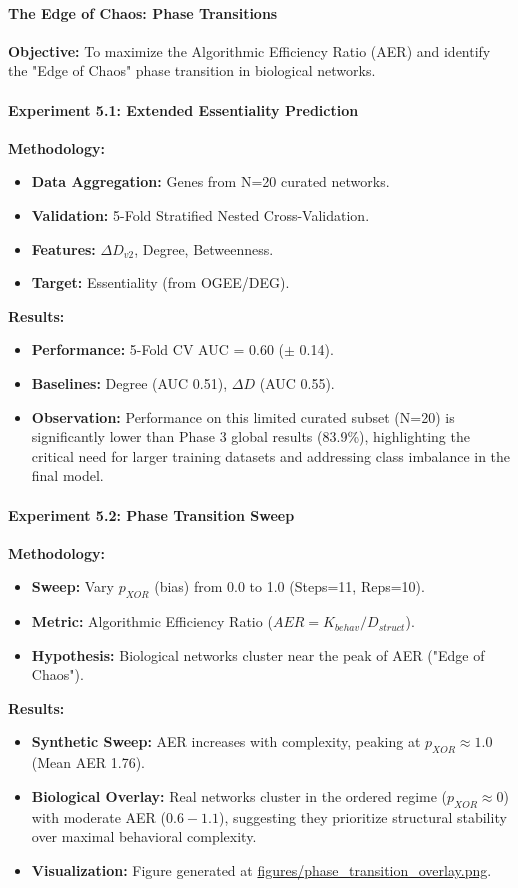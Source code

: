 \paragraph{The Edge of Chaos: Phase Transitions}
\textbf{Objective:} To maximize the Algorithmic Efficiency Ratio (AER) and identify the "Edge of Chaos" phase transition in biological networks.

\paragraph{Experiment 5.1: Extended Essentiality Prediction}
\textbf{Methodology:}
\begin{itemize}
    \item \textbf{Data Aggregation:} Genes from N=20 curated networks.
    \item \textbf{Validation:} 5-Fold Stratified Nested Cross-Validation.
    \item \textbf{Features:} $\Delta D_{v2}$, Degree, Betweenness.
    \item \textbf{Target:} Essentiality (from OGEE/DEG).
\end{itemize}
\textbf{Results:}
\begin{itemize}
    \item \textbf{Performance:} 5-Fold CV AUC = 0.60 ($\pm$ 0.14).
    \item \textbf{Baselines:} Degree (AUC 0.51), $\Delta D$ (AUC 0.55).
    \item \textbf{Observation:} Performance on this limited curated subset (N=20) is significantly lower than Phase 3 global results (83.9\%), highlighting the critical need for larger training datasets and addressing class imbalance in the final model.
\end{itemize}

\paragraph{Experiment 5.2: Phase Transition Sweep}
\textbf{Methodology:}
\begin{itemize}
    \item \textbf{Sweep:} Vary $p_{XOR}$ (bias) from 0.0 to 1.0 (Steps=11, Reps=10).
    \item \textbf{Metric:} Algorithmic Efficiency Ratio ($AER = K_{behav} / D_{struct}$).
    \item \textbf{Hypothesis:} Biological networks cluster near the peak of AER ("Edge of Chaos").
\end{itemize}
\textbf{Results:}
\begin{itemize}
    \item \textbf{Synthetic Sweep:} AER increases with complexity, peaking at $p_{XOR} \approx 1.0$ (Mean AER 1.76).
    \item \textbf{Biological Overlay:} Real networks cluster in the ordered regime ($p_{XOR} \approx 0$) with moderate AER ($0.6 - 1.1$), suggesting they prioritize structural stability over maximal behavioral complexity.
    \item \textbf{Visualization:} Figure generated at \url{figures/phase_transition_overlay.png}.
\end{itemize}


